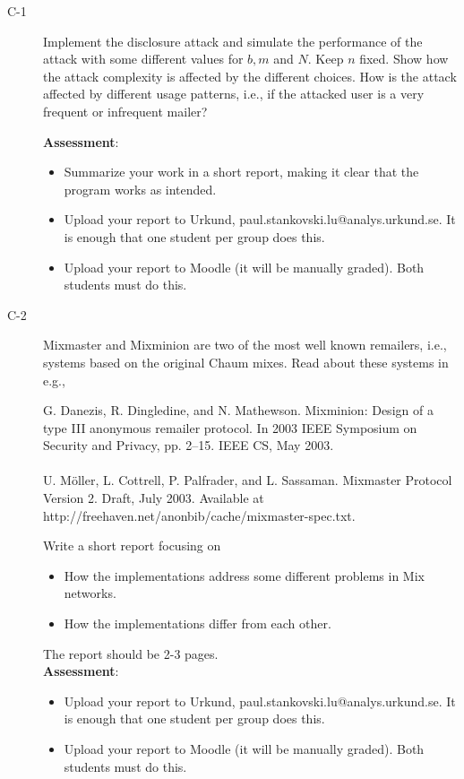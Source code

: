 \documentclass{article}
\begin{document}
\begin{description}
	\item[C-1]{Implement the disclosure attack and simulate the performance of the attack with some different values for $b, m$ and $N$. Keep $n$ fixed. Show how the attack complexity is affected by the different choices. How is the attack affected by different usage patterns, i.e., if the attacked user is a very frequent or infrequent mailer?

	\textbf{Assessment}:
	\begin{itemize}
		\item Summarize your work in a short report, making it clear that the program works as intended.
		\item Upload your report to Urkund, paul.stankovski.lu@analys.urkund.se. It is enough that one student per group does this.
		\item Upload your report to Moodle (it will be manually graded). Both students must do this.
	\end{itemize}
	}

	\item[C-2]{Mixmaster and Mixminion are two of the most well known remailers, i.e., systems based on the original Chaum mixes. Read about these systems in e.g., 
		\begin{center}
		\begin{minipage}{0.8\textwidth}
		G. Danezis, R. Dingledine, and N. Mathewson. Mixminion: Design of a type III anonymous remailer protocol. In 2003 IEEE Symposium on Security and Privacy, pp. 2--15. IEEE CS, May 2003.\\\\
		U. M\"oller, L. Cottrell, P. Palfrader, and L. Sassaman. Mixmaster Protocol Version 2. Draft, July 2003. Available at http://freehaven.net/anonbib/cache/mixmaster-spec.txt.
		\end{minipage}
		\end{center}
		Write a short report focusing on
		\begin{itemize}
		\item How the implementations address some different problems in Mix networks.
		\item How the implementations differ from each other.
		\end{itemize}
		The report should be 2-3 pages.\\
	\textbf{Assessment}:
	\begin{itemize}
		\item Upload your report to Urkund, paul.stankovski.lu@analys.urkund.se. It is enough that one student per group does this.
		\item Upload your report to Moodle (it will be manually graded). Both students must do this.
	\end{itemize}
	}
\end{description}
\end{document}
